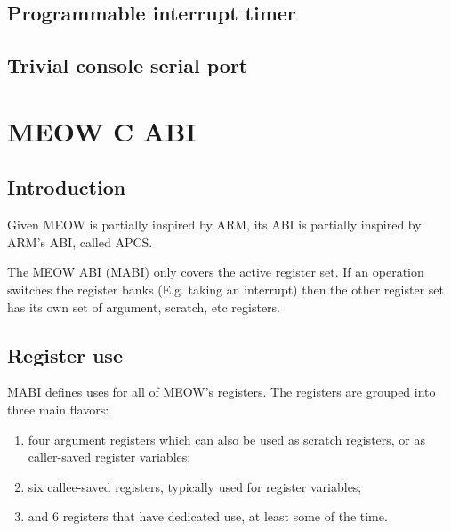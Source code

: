 \documentclass[a4paper,twoside,openany]{book}
\begin{document}
    \section{Programmable interrupt timer}
    \section{Trivial console serial port}
    
  \chapter{MEOW C ABI}
    \section{Introduction}
      Given MEOW is partially inspired by ARM, its ABI is partially inspired by
      ARM's ABI, called APCS.

      The MEOW ABI (MABI) only covers the active register set. If an operation
      switches the register banks (E.g. taking an interrupt) then the other
      register set has its own set of argument, scratch, etc registers.
    
    \section{Register use}
      MABI defines uses for all of MEOW's registers.  The registers are grouped
      into three main flavors:
      \begin{enumerate}
        \item four argument registers which can also be used as scratch 
          registers, or as caller-saved register variables;
        \item six callee-saved registers, typically used for register variables;
        \item and 6 registers that have dedicated use, at least some of
          the time.
      \end{enumerate}
      
\end{document}
